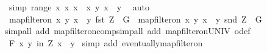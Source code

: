 \begin{isabellebody}
\ {\isacharbrackleft}{\kern0pt}simp{\isacharbrackright}{\kern0pt}{\isacharcolon}{\kern0pt}\ {\isachardoublequoteopen}range\ {\isacharparenleft}{\kern0pt}{\isasymlambda}x{\isachardot}{\kern0pt}\ {\isacharparenleft}{\kern0pt}x{\isacharcomma}{\kern0pt}\ x{\isacharparenright}{\kern0pt}{\isacharparenright}{\kern0pt}\ {\isasymsubseteq}\ {\isacharbraceleft}{\kern0pt}{\isacharparenleft}{\kern0pt}x{\isacharcomma}{\kern0pt}\ y{\isacharparenright}{\kern0pt}{\isachardot}{\kern0pt}\ x\ {\isacharequal}{\kern0pt}\ y{\isacharbraceright}{\kern0pt}{\isachardoublequoteclose}\ \isamarkupfalse%
\ auto\isanewline
\ \ \ \ \isamarkupfalse%
\ {\isachardoublequoteopen}map{\isacharunderscore}{\kern0pt}filter{\isacharunderscore}{\kern0pt}on\ {\isacharbraceleft}{\kern0pt}{\isacharparenleft}{\kern0pt}x{\isacharcomma}{\kern0pt}\ y{\isacharparenright}{\kern0pt}{\isachardot}{\kern0pt}\ x\ {\isacharequal}{\kern0pt}\ y{\isacharbraceright}{\kern0pt}\ fst\ {\isacharquery}{\kern0pt}Z\ {\isacharequal}{\kern0pt}\ G{\isachardoublequoteclose}\ \ {\isachardoublequoteopen}map{\isacharunderscore}{\kern0pt}filter{\isacharunderscore}{\kern0pt}on\ {\isacharbraceleft}{\kern0pt}{\isacharparenleft}{\kern0pt}x{\isacharcomma}{\kern0pt}\ y{\isacharparenright}{\kern0pt}{\isachardot}{\kern0pt}\ x\ {\isacharequal}{\kern0pt}\ y{\isacharbraceright}{\kern0pt}\ snd\ {\isacharquery}{\kern0pt}Z\ {\isacharequal}{\kern0pt}\ G{\isachardoublequoteclose}\isanewline
\ \ \ \ \ \ \isamarkupfalse%
{\isacharparenleft}{\kern0pt}simp{\isacharunderscore}{\kern0pt}all\ add{\isacharcolon}{\kern0pt}\ map{\isacharunderscore}{\kern0pt}filter{\isacharunderscore}{\kern0pt}on{\isacharunderscore}{\kern0pt}comp{\isacharparenright}{\kern0pt}{\isacharparenleft}{\kern0pt}simp{\isacharunderscore}{\kern0pt}all\ add{\isacharcolon}{\kern0pt}\ map{\isacharunderscore}{\kern0pt}filter{\isacharunderscore}{\kern0pt}on{\isacharunderscore}{\kern0pt}UNIV\ o{\isacharunderscore}{\kern0pt}def{\isacharparenright}{\kern0pt}\isanewline
\ \ \ \ \isamarkupfalse%
\ {\isachardoublequoteopen}{\isasymforall}\isactrlsub F\ {\isacharparenleft}{\kern0pt}x{\isacharcomma}{\kern0pt}\ y{\isacharparenright}{\kern0pt}\ in\ {\isacharquery}{\kern0pt}Z{\isachardot}{\kern0pt}\ x\ {\isacharequal}{\kern0pt}\ y{\isachardoublequoteclose}\ \isamarkupfalse%
{\isacharparenleft}{\kern0pt}simp\ add{\isacharcolon}{\kern0pt}\ eventually{\isacharunderscore}{\kern0pt}map{\isacharunderscore}{\kern0pt}filter{\isacharunderscore}{\kern0pt}on{\isacharparenright}{\kern0pt}\isanewline
\ \ \isamarkupfalse%

\end{isabellebody}
